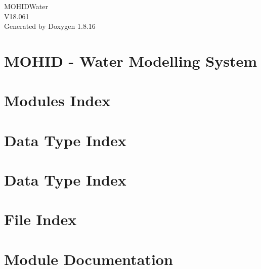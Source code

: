 \let\mypdfximage\pdfximage\def\pdfximage{\immediate\mypdfximage}\documentclass[twoside]{book}
\newcommand{\+}{\discretionary{\mbox{\scriptsize$\hookleftarrow$}}{}{}}
\newcommand{\clearemptydoublepage}{%
  \newpage{\pagestyle{empty}\cleardoublepage}%
}
\begin{document}
\hypersetup{pageanchor=false,
             bookmarksnumbered=true,
             pdfencoding=unicode
            }
\begin{titlepage}
\vspace*{7cm}
\begin{center}%
{\Large M\+O\+H\+I\+D\+Water \\[1ex]\large V18.\+061 }\\
\vspace*{1cm}
{\large Generated by Doxygen 1.8.16}\\
\end{center}
\end{titlepage}
\clearemptydoublepage
{}
\tableofcontents
\clearemptydoublepage
{}
\hypersetup{pageanchor=true}

\chapter{M\+O\+H\+ID -\/ Water Modelling System}
\label{index}\hypertarget{index}{}
\chapter{Modules Index}

\chapter{Data Type Index}

\chapter{Data Type Index}

\chapter{File Index}

\chapter{Module Documentation}



























\end{document}
